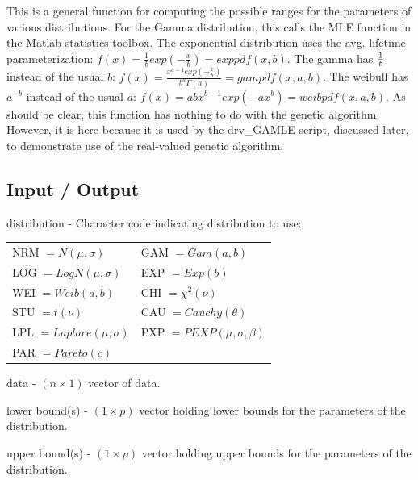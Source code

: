 \documentclass{book}
\newcommand{\textcode}[1]{\textsf{\small #1}}   %
\begin{document}
This is a general function for computing the possible ranges for the
parameters of various distributions. For the Gamma distribution,
this calls the MLE function in the Matlab statistics toolbox. The
exponential
distribution uses the avg. lifetime parameterization: $f\left( x\right) =%
\frac{1}{b}exp\left( -\frac{x}{b}\right) =exppdf(x,b)$. The gamma has $\frac{%
1}{b}$ instead of the usual $b$: $f\left( x\right) =\frac{x^{a-1}exp\left( -%
\frac{x}{b}\right) }{b^{a}\Gamma \left( a\right) }=gampdf(x,a,b)$.
The weibull has $a^{-b}$ instead of the usual $a$: $f\left( x\right)
=abx^{b-1}exp(-ax^{b})=weibpdf(x,a,b)$. As should be clear, this
function has nothing to do with the genetic algorithm. However, it
is here because it is used by the \textcode{drv\_GAMLE} script,
discussed later, to demonstrate use of the real-valued genetic
algorithm.

\subsection*{Input / Output}

\begin{compactitem}

\item \textcode{distribution} - Character code indicating distribution to use:

\begin{tabular}{ll}
NRM $=N\left( \mu ,\sigma \right)$ & GAM $=Gam\left( a,b\right)$ \\
LOG $=LogN\left( \mu ,\sigma \right)$ & EXP $=Exp\left( b\right)$ \\
WEI $=Weib\left( a,b\right)$ & CHI $=\chi ^{2}\left( \nu \right)$ \\
STU $=t\left( \nu \right)$ & CAU $=Cauchy\left( \theta \right)$ \\
LPL $=Laplace\left( \mu ,\sigma \right)$ & PXP $=PEXP\left( \mu ,\sigma,\beta \right)$ \\
PAR $=Pareto\left( c\right)$
\end{tabular}

\item \textcode{data} - $\left( n \times 1 \right)$ vector of data.

\item \textcode{lower bound(s)} - $\left( 1 \times p \right)$ vector holding lower bounds for the parameters of the distribution.

\item \textcode{upper bound(s)} - $\left( 1 \times p \right)$ vector holding upper bounds for the parameters of the distribution.

\end{compactitem}
\end{document}
